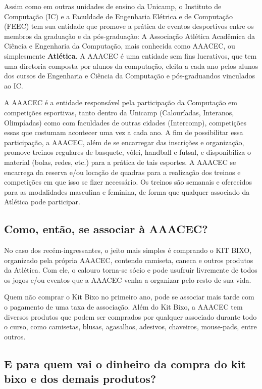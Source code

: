 Assim como em outras unidades de ensino da Unicamp, o Instituto de Computação
(IC) e a Faculdade de Engenharia Elétrica e de Computação (FEEC) tem sua
entidade que promove a prática de eventos desportivos entre os membros da
graduação e da pós-graduação: A Associação Atlética Acadêmica da Ciência
e Engenharia da Computação, mais conhecida como AAACEC, ou simplesmente
\textbf{Atlética}. A AAACEC é uma entidade sem fins lucrativos, que tem uma
diretoria composta por alunos da computação, eleita a cada ano pelos alunos
dos cursos de Engenharia e Ciência da Computação e pós-graduandos vinculados ao IC.

A AAACEC é a entidade responsável pela participação da Computação em competições
esportivas, tanto dentro da Unicamp (Calouríadas, Interanos, Olimpíadas) como
com faculdades de outras cidades (Intercomp), competições essas que costumam
acontecer uma vez a cada ano. A fim de possibilitar essa participação, a AAACEC,
além de se encarregar das inscrições e organização, promove treinos regulares de
basquete, vôlei, handball e futsal, e disponibiliza o material (bolas, redes,
etc.) para a prática de tais esportes. A AAACEC se encarrega da reserva e/ou
locação de quadras para a realização dos treinos e competições em que isso se
fizer necessário. Os treinos são semanais e oferecidos para as modalidades
masculina e feminina, de forma que qualquer associado da Atlética pode
participar.

\subsection{Como, então, se associar à AAACEC?}

No caso dos recém-ingressantes, o jeito mais simples é comprando o KIT BIXO,
organizado pela própria AAACEC, contendo camiseta, caneca e outros produtos da
Atlética. Com ele, o calouro torna-se sócio e pode usufruir livremente de todos
os jogos e/ou eventos que a AAACEC venha a organizar pelo resto de sua vida.

Quem não comprar o Kit Bixo no primeiro ano, pode se associar mais tarde com o
pagamento de uma taxa de associação. Além do Kit Bixo, a AAACEC tem diversos
produtos que podem ser comprados por qualquer associado durante todo o curso,
como camisetas, blusas, agasalhos, adesivos, chaveiros, mouse-pads, entre
outros.

\subsection{E para quem vai o dinheiro da compra do kit bixo e dos demais produtos?}

